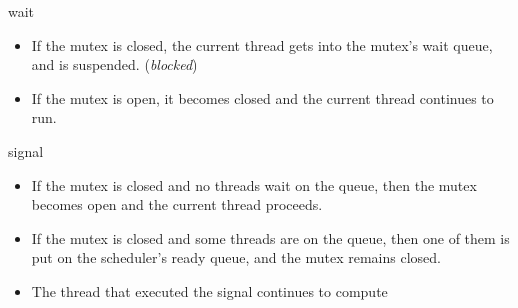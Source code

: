 \documentclass{article}
\begin{document}
\begin{huge}
wait 
\begin{itemize}
\item If the mutex is closed, the current thread gets into the mutex's wait queue,
and is suspended. ({\it blocked})
\item If the mutex is open, it becomes closed and the current thread continues to run.
\end{itemize}


signal
\begin{itemize}
\item If the mutex is closed and no threads wait on the queue, then the mutex
becomes open and the current thread proceeds.
\item If the mutex is closed and some threads are on the queue, then one of them
is put on the scheduler's ready queue, and the mutex remains closed.
\item The thread that executed the signal continues to compute 
\end{itemize}


\end{huge} 
\end{document}
